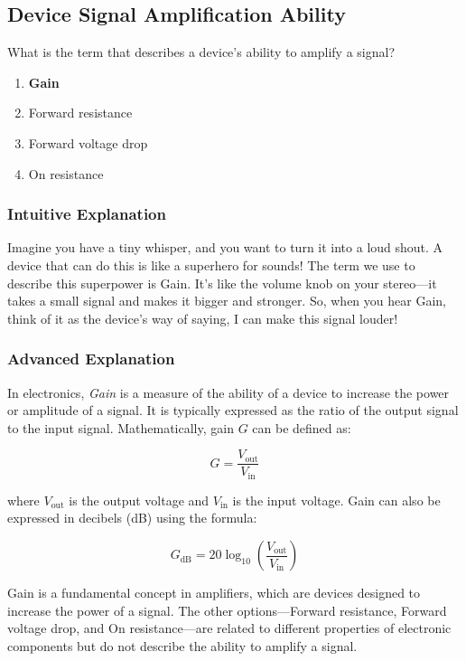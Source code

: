 \subsection{Device Signal Amplification Ability}
\label{T6B11}

\begin{tcolorbox}[colback=gray!10!white,colframe=black!75!black,title=T6B11]
What is the term that describes a device's ability to amplify a signal?
\begin{enumerate}[label=\Alph*)]
    \item \textbf{Gain}
    \item Forward resistance
    \item Forward voltage drop
    \item On resistance
\end{enumerate}
\end{tcolorbox}

\subsubsection{Intuitive Explanation}
Imagine you have a tiny whisper, and you want to turn it into a loud shout. A device that can do this is like a superhero for sounds! The term we use to describe this superpower is Gain. It’s like the volume knob on your stereo—it takes a small signal and makes it bigger and stronger. So, when you hear Gain, think of it as the device’s way of saying, I can make this signal louder!

\subsubsection{Advanced Explanation}
In electronics, \textit{Gain} is a measure of the ability of a device to increase the power or amplitude of a signal. It is typically expressed as the ratio of the output signal to the input signal. Mathematically, gain \( G \) can be defined as:

\[
G = \frac{V_{\text{out}}}{V_{\text{in}}}
\]

where \( V_{\text{out}} \) is the output voltage and \( V_{\text{in}} \) is the input voltage. Gain can also be expressed in decibels (dB) using the formula:

\[
G_{\text{dB}} = 20 \log_{10}\left(\frac{V_{\text{out}}}{V_{\text{in}}}\right)
\]

Gain is a fundamental concept in amplifiers, which are devices designed to increase the power of a signal. The other options—Forward resistance, Forward voltage drop, and On resistance—are related to different properties of electronic components but do not describe the ability to amplify a signal.

